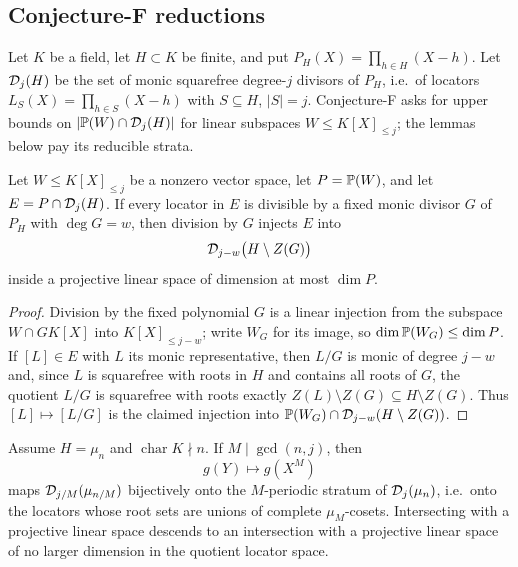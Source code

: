 \subsection{Conjecture-F reductions}

Let $K$ be a field, let $H\subset K$ be finite, and put $P_H(X)=\prod_{h\in H}(X-h)$.  Let $\mathcal D_j(H)$ be the set of monic squarefree degree-$j$ divisors of $P_H$, i.e.\ of locators $L_S(X)=\prod_{h\in S}(X-h)$ with $S\subseteq H$, $|S|=j$.  Conjecture-F asks for upper bounds on $|\mathbb P(W)\cap\mathcal D_j(H)|$ for linear subspaces $W\le K[X]_{\le j}$; the lemmas below pay its reducible strata.

\begin{lemma}\label{lem:v13-gcd}
Let $W\le K[X]_{\le j}$ be a nonzero vector space, let $P=\mathbb P(W)$, and let $E=P\cap\mathcal D_j(H)$.  If every locator in $E$ is divisible by a fixed monic divisor $G$ of $P_H$ with $\deg G=w$, then division by $G$ injects $E$ into
\[
        \mathcal D_{j-w}\bigl(H\setminus Z(G)\bigr)
\]
inside a projective linear space of dimension at most $\dim P$.
\end{lemma}

\begin{proof}
Division by the fixed polynomial $G$ is a linear injection from the subspace $W\cap GK[X]$ into $K[X]_{\le j-w}$; write $W_G$ for its image, so $\dim\mathbb P(W_G)\le\dim P$.  If $[L]\in E$ with $L$ its monic representative, then $L/G$ is monic of degree $j-w$ and, since $L$ is squarefree with roots in $H$ and contains all roots of $G$, the quotient $L/G$ is squarefree with roots exactly $Z(L)\setminus Z(G)\subseteq H\setminus Z(G)$.  Thus $[L]\mapsto[L/G]$ is the claimed injection into $\mathbb P(W_G)\cap\mathcal D_{j-w}(H\setminus Z(G))$.
\end{proof}

\begin{lemma}\label{lem:v13-quot-pullback}
Assume $H=\mu_n$ and $\operatorname{char}K\nmid n$.  If $M\mid\gcd(n,j)$, then
\[
        g(Y)\longmapsto g(X^M)
\]
maps $\mathcal D_{j/M}(\mu_{n/M})$ bijectively onto the $M$-periodic stratum of $\mathcal D_j(\mu_n)$, i.e.\ onto the locators whose root sets are unions of complete $\mu_M$-cosets.  Intersecting with a projective linear space descends to an intersection with a projective linear space of no larger dimension in the quotient locator space.
\end{lemma}

